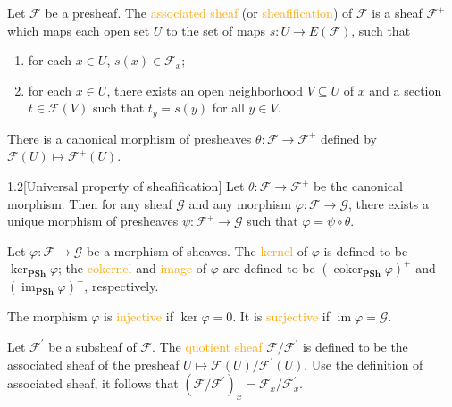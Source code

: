 \begin{definition}
	Let $\mathcal{F}$ be a presheaf. The \textcolor{orange}{associated sheaf} (or \textcolor{orange}{sheafification}) of $\mathcal{F}$ is a sheaf $\mathcal{F}^+$ which maps each open set $U$ to the set of maps $s:U\rightarrow E(\mathcal{F})$, such that
	\begin{enumerate}[label=\textup{(\arabic*)}]
		\item for each $x\in U$, $s(x)\in\mathcal{F}_x$;
		\item for each $x\in U$, there exists an open neighborhood $V\subseteq U$ of $x$ and a section $t\in\mathcal{F}(V)$ such that $t_y=s(y)$ for all $y\in V$.
	\end{enumerate}
	
	There is a canonical morphism of presheaves $\theta:\mathcal{F}\rightarrow\mathcal{F}^+$ defined by $\mathcal{F}(U)\mapsto\mathcal{F}^+(U)$.
\end{definition}

\begin{proposition}{1.2}[Universal property of sheafification]
	Let $\theta:\mathcal{F}\rightarrow\mathcal{F}^+$ be the canonical morphism. Then for any sheaf $\mathcal{G}$ and any morphism $\varphi:\mathcal{F} \rightarrow\mathcal{G}$, there exists a unique morphism of presheaves $\psi:\mathcal{F}^+\rightarrow\mathcal{G}$ such that $\varphi=\psi\circ\theta$.
\end{proposition}

\begin{definition}
	Let $\varphi:\mathcal{F}\rightarrow\mathcal{G}$ be a morphism of sheaves. The \textcolor{orange}{kernel} of $\varphi$ is defined to be $\ker_\mathbf{PSh}\varphi$; the \textcolor{orange}{cokernel} and \textcolor{orange}{image} of $\varphi$ are defined to be $(\operatorname{coker}_\mathbf{PSh}\varphi)^+$ and $(\operatorname{im}_\mathbf{PSh}\varphi)^+$, respectively.
	
	The morphism $\varphi$ is \textcolor{orange}{injective} if $\ker\varphi=0$. It is \textcolor{orange}{surjective} if $\operatorname{im}\varphi=\mathcal{G}$.
	
	Let $\mathcal{F}^\prime$ be a subsheaf of $\mathcal{F}$. The \textcolor{orange}{quotient sheaf} $\mathcal{F}/\mathcal{F}^\prime$ is defined to be the associated sheaf of the presheaf $U\mapsto\mathcal{F}(U)/\mathcal{F}^\prime(U)$. Use the definition of associated sheaf, it follows that $(\mathcal{F}/\mathcal{F}^\prime)_x=\mathcal{F}_x/\mathcal{F}_x^\prime$.
\end{definition}


